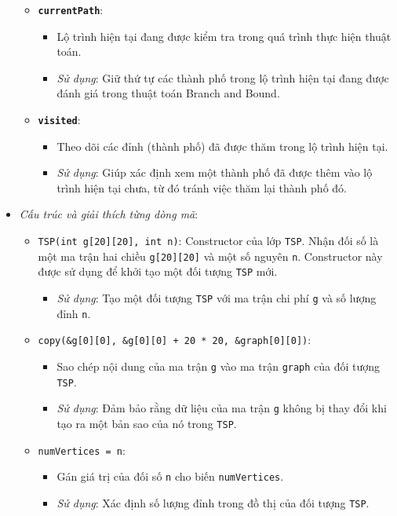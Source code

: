 \documentclass[a4paper]{article}
\begin{document}
\begin{itemize}
\begin{itemize}
    \item \textbf{\texttt{currentPath}}: 
    \begin{itemize}
        \item Lộ trình hiện tại đang được kiểm tra trong quá trình thực hiện thuật toán.
        \item \textit{Sử dụng}: Giữ thứ tự các thành phố trong lộ trình hiện tại đang được đánh giá trong thuật toán Branch and Bound.
    \end{itemize}

    \item \textbf{\texttt{visited}}: 
    \begin{itemize}
        \item Theo dõi các đỉnh (thành phố) đã được thăm trong lộ trình hiện tại.
        \item \textit{Sử dụng}: Giúp xác định xem một thành phố đã được thêm vào lộ trình hiện tại chưa, từ đó tránh việc thăm lại thành phố đó.
    \end{itemize}
\end{itemize}

\item \textit{Cấu trúc và giải thích từng dòng mã}:
\begin{itemize}
\item \texttt{TSP(int g[20][20], int n)}: Constructor của lớp \texttt{TSP}. Nhận đối số là một ma trận hai chiều \texttt{g[20][20]} và một số nguyên \texttt{n}. Constructor này được sử dụng để khởi tạo một đối tượng \texttt{TSP} mới.
\begin{itemize}
\item \textit{Sử dụng}: Tạo một đối tượng \texttt{TSP} với ma trận chi phí \texttt{g} và số lượng đỉnh \texttt{n}.
\end{itemize}
\item \texttt{copy(\&g[0][0], \&g[0][0] + 20 * 20, \&graph[0][0])}:
    \begin{itemize}
        \item Sao chép nội dung của ma trận \texttt{g} vào ma trận \texttt{graph} của đối tượng \texttt{TSP}.
        \item \textit{Sử dụng}: Đảm bảo rằng dữ liệu của ma trận \texttt{g} không bị thay đổi khi tạo ra một bản sao của nó trong \texttt{TSP}.
    \end{itemize}
    
    \item \texttt{numVertices = n}:
    \begin{itemize}
        \item Gán giá trị của đối số \texttt{n} cho biến \texttt{numVertices}.
        \item \textit{Sử dụng}: Xác định số lượng đỉnh trong đồ thị của đối tượng \texttt{TSP}.
    \end{itemize}
    

\end{itemize}
\end{itemize}
\end{document}
